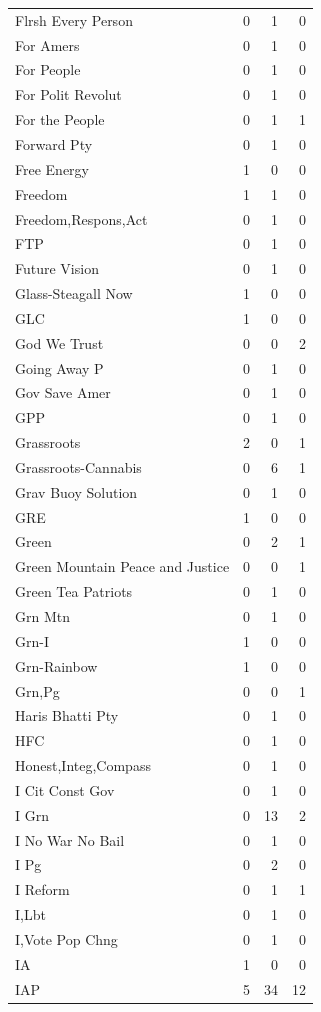 \begin{supertabular}{lrrr}
Flrsh Every Person & 0 & 1 & 0\\
For Amers & 0 & 1 & 0\\
For People & 0 & 1 & 0\\
For Polit Revolut & 0 & 1 & 0\\
For the People & 0 & 1 & 1\\
Forward Pty & 0 & 1 & 0\\
Free Energy & 1 & 0 & 0\\
Freedom & 1 & 1 & 0\\
Freedom,Respons,Act & 0 & 1 & 0\\
FTP & 0 & 1 & 0\\
Future Vision & 0 & 1 & 0\\
Glass-Steagall Now & 1 & 0 & 0\\
GLC & 1 & 0 & 0\\
God We Trust & 0 & 0 & 2\\
Going Away P & 0 & 1 & 0\\
Gov Save Amer & 0 & 1 & 0\\
GPP & 0 & 1 & 0\\
Grassroots & 2 & 0 & 1\\
Grassroots-Cannabis & 0 & 6 & 1\\
Grav Buoy Solution & 0 & 1 & 0\\
GRE & 1 & 0 & 0\\
Green & 0 & 2 & 1\\
Green Mountain Peace and Justice & 0 & 0 & 1\\
Green Tea Patriots & 0 & 1 & 0\\
Grn Mtn & 0 & 1 & 0\\
Grn-I & 1 & 0 & 0\\
Grn-Rainbow & 1 & 0 & 0\\
Grn,Pg & 0 & 0 & 1\\
Haris Bhatti Pty & 0 & 1 & 0\\
HFC & 0 & 1 & 0\\
Honest,Integ,Compass & 0 & 1 & 0\\
I Cit Const Gov & 0 & 1 & 0\\
I Grn & 0 & 13 & 2\\
I No War No Bail & 0 & 1 & 0\\
I Pg & 0 & 2 & 0\\
I Reform & 0 & 1 & 1\\
I,Lbt & 0 & 1 & 0\\
I,Vote Pop Chng & 0 & 1 & 0\\
IA & 1 & 0 & 0\\
IAP & 5 & 34 & 12\\

\end{supertabular}
